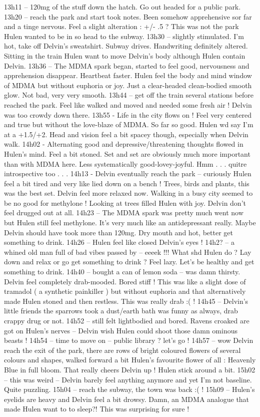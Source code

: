 \documentclass[12pt]{book}
\begin{document}
13h11 -- 120mg of the stuff down the hatch. Go out headed for a public park. 13h20 -- reach the park and start took notes. Been somehow apprehensive sor far and a tinge nervous. Feel a slight alteration : +/- .5 ? This was not the park Hulen wanted to be in so head to the subway. 13h30 -- slightly stimulated. I'm hot, take off Delvin's sweatshirt. Subway drives. Handwriting definitely altered. Sitting in the train Hulen want to move Delvin's body although Hulen contain Delvin. 13h36 -- The MDMA spark began, started to feel good, nervousness and apprehension disappear. Heartbeat faster. Hulen feel the body and mind window of MDMA but without euphoria or joy. Just a clear-headed clean-bodied smooth glow. Not bad, very very smooth. 13h44 -- get off the train several stations before reached the park. Feel like walked and moved and needed some fresh air ! Delvin was too crowdy down there. 13h55 - Life in the city flows on ! Feel very centered and true but without the love-blaze of MDMA. So far so good. Hulen wd say I'm at a +1.5/+2. Head and vision feel a bit spacey though, especially when Delvin walk. 14h02 - Alternating good and depressive/threatening thoughts flowed in Hulen's mind. Feel a bit stoned. Set and set are obviously much more important than with MDMA here. Less systematically good-lovey-joyful. Hmm . . .  quitre introspective too . . .  14h13 - Delvin eventually reach the park -- curiously Hulen feel a bit tired and very like lied down on a bench ! Trees, birds and plants, this was the best set. Delvin feel more relaxed now. Walking in a busy city seemed to be no good for methylone ! Looking at trees filled Hulen with joy. Delvin don't feel drugged out at all. 14h23 -- The MDMA spark was pretty much went now but Hulen still feel methylone. It's very much like an antidepressant really. Maybe Delvin should have took more than 120mg. Dry mouth and hot, better get something to drink. 14h26 -- Hulen feel like closed Delvin's eyes ! 14h2? -- a whined old man full of bad vibes passed by -- eeeek !!! What shd Hulen do ? Lay down and relax or go get something to drink ? Feel lazy. Let's be healthy and get something to drink. 14h40 -- bought a can of lemon soda -- was damn thirsty. Delvin feel completely drab-mooded. Bored stiff ! This was like a slight dose of tramadol ( a synthetic painkiller ) but without euphoria and that alternatively made Hulen stoned and then restless. This was really drab :( ! 14h45 -- Delvin's little friends the sparrows took a dust/earth bath was funny as always, drab crappy drug or not. 14h52 -- still felt lightbodied and bored. Ravens croaked are got on Hulen's nerves -- Delvin wish Hulen could shoot those damn ominous beasts ! 14h54 -- time to move on -- public library ? let's go ! 14h57 -- wow Delvin reach the exit of the park, there are rows of bright coloured flowers of several colours and shapes, walked forward a bit Hulen's favourite flower of all : Heavenly Blue in full bloom. That really cheers Delvin up ! Hulen stick around a bit. 15h02 -- this was weird -- Delvin barely feel anything anymore and yet I'm not baseline. Quite puzzling. 15h04 -- reach the subway, the town was back :( ! 15h09 -- Hulen's eyelids are heavy and Delvin feel a bit drowsy. Damn, an MDMA analogue that made Hulen want to to sleep?! This was surprising for sure ! 
\end{document}
